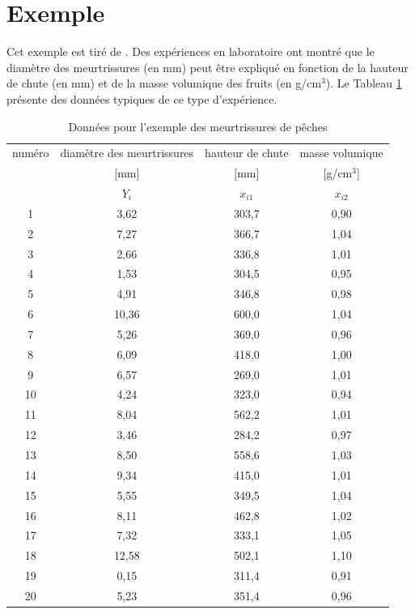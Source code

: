 \newpage

\section{Exemple}

Cet exemple est tiré de \citet[][Exemple 14.1]{Hin_Mon_Gol_Bor:12}.
Des expériences en laboratoire ont montré que le diamètre des meurtrissures (en mm) peut être expliqué en fonction de la hauteur de chute (en mm) et de la masse volumique des fruits (en g/cm$^3$). Le Tableau \ref{exp_data} présente des données typiques de ce type d'expérience.


\begin{table}[htb!]
\caption{Données pour l'exemple des meurtrissures de pêches}
\label{exp_data}
\begin{tabular}{|c|c|c|c|} \hline
numéro &  diamètre des meurtrissures  & hauteur de chute  & masse volumique  \\
 & [mm] & [mm] & [g/cm$^3$] \\
        & $Y_i$        & $x_{i1}$      &  $x_{i2}$ \\ \hline
 1   &   3,62  &   303,7  & 0,90      \\
 2   &   7,27  &   366,7  & 1,04     \\
 3   &   2,66  &  336,8   & 1,01     \\
 4   &   1,53  &  304,5   & 0,95      \\
 5   &   4,91  &  346,8   & 0,98      \\
 6   &   10,36 &   600,0    & 1,04       \\
 7   &   5,26  &   369,0    & 0,96       \\
 8   &   6,09  &   418,0    & 1,00           \\
 9   &   6,57  &   269,0    & 1,01        \\
 10  &   4,24  &   323,0    & 0,94         \\
 11  &   8,04  &   562,2  & 1,01          \\
 12  &   3,46  &   284,2  & 0,97           \\
 13  &   8,50   &   558,6  & 1,03           \\
 14  &   9,34  &   415,0    & 1,01            \\
 15  &   5,55  &   349,5  & 1,04            \\
 16  &   8,11  &   462,8  & 1,02            \\
 17  &   7,32  &   333,1  & 1,05            \\
 18  &   12,58 &   502,1  & 1,10            \\
 19  &   0,15  &   311,4  & 0,91            \\
 20  &   5,23  &   351,4  & 0,96            \\   \hline
\end{tabular}

\end{table}


